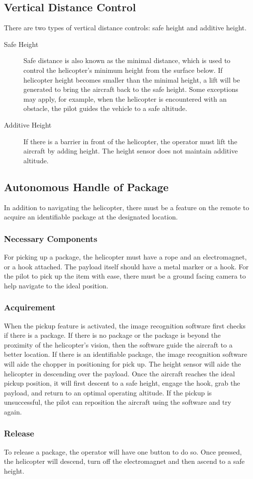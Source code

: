 \documentclass[onecolumn, oneside, letterpaper, draftclsnofoot, 10pt, compsoc]{IEEEtran}
\begin{document}
\subsection{Vertical Distance Control}
There are two types of vertical distance controls: safe height and additive height.
\begin{description}
\item [Safe Height] Safe distance is also known as the minimal distance, which is used to control the helicopter's minimum height from the surface below. If helicopter height becomes smaller than the minimal height, a lift will be generated to bring the aircraft back to the safe height. Some exceptions may apply, for example, when the helicopter is encountered with an obstacle, the pilot guides the vehicle to a safe altitude.
\item [Additive Height] If there is a barrier in front of the helicopter, the operator must lift the aircraft by adding height. The height sensor does not maintain additive altitude.
\end{description}

\subsection{Autonomous Handle of Package}
In addition to navigating the helicopter, there must be a feature on the remote to acquire an identifiable package at the designated location.

\subsubsection{Necessary Components}
For picking up a package, the helicopter must have a rope and an electromagnet, or a hook attached. The payload itself should have a metal marker or a hook. For the pilot to pick up the item with ease, there must be a ground facing camera to help navigate to the ideal position.

\subsubsection{Acquirement}
When the pickup feature is activated, the image recognition software first checks if there is a package. If there is no package or the package is beyond the proximity of the helicopter's vision, then the software guide the aircraft to a better location. If there is an identifiable package, the image recognition software will aide the chopper in positioning for pick up. The height sensor will aide the helicopter in descending over the payload. Once the aircraft reaches the ideal pickup position, it will first descent to a safe height,  engage the hook, grab the payload, and return to an optimal operating altitude. If the pickup is unsuccessful, the pilot can reposition the aircraft using the software and try again.

\subsubsection{Release}
To release a package, the operator will have one button to do so. Once pressed, the helicopter will descend, turn off the electromagnet and then ascend to a safe height.
\end{document}
